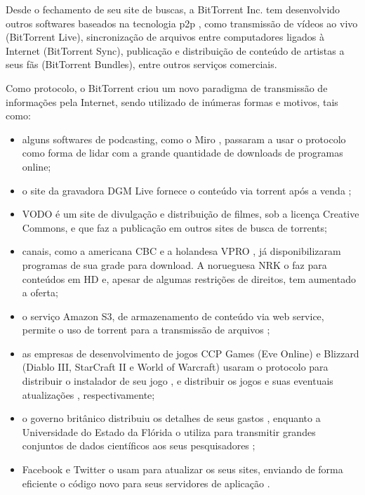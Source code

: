 Desde o fechamento de seu site de buscas, a BitTorrent Inc. tem desenvolvido outros
softwares baseados na tecnologia \gls*{p2p} \cite{site:bittorrent}, como transmissão de
vídeos ao vivo (BitTorrent Live), sincronização de arquivos entre computadores ligados
à Internet (BitTorrent Sync), publicação e distribuição de conteúdo de artistas a seus
fãs (BitTorrent Bundles), entre outros serviços comerciais.

Como protocolo, o BitTorrent criou um novo paradigma de transmissão de informações pela
Internet, sendo utilizado de inúmeras formas e motivos, tais como:

\begin{itemize}
    \item alguns softwares de podcasting, como o Miro \cite{site:miro}, passaram a
        usar o protocolo como forma de lidar com a grande quantidade de downloads de
        programas online;

    \item o site da gravadora DGM Live fornece o conteúdo via torrent após a venda
        \cite{site:dgm};

    \item VODO \cite{site:vodo} é um site de divulgação e distribuição de filmes, sob a
        licença Creative Commons, e que faz a publicação em outros sites de busca de
        torrents;

    \item canais, como a americana CBC \cite{site:cbc} e a holandesa VPRO
        \cite{site:vpro}, já disponibilizaram programas de sua grade para download. A
        norueguesa NRK o faz para conteúdos em HD \cite{site:nrk} e, apesar de algumas
        restrições de direitos, tem aumentado a oferta;

    \item o serviço Amazon S3, de armazenamento de conteúdo via web service, permite o
        uso de torrent para a transmissão de arquivos \cite{site:aws-s3};

    \item as empresas de desenvolvimento de jogos CCP Games (Eve Online) e Blizzard
        (Diablo III, StarCraft II e World of Warcraft) usaram o protocolo para
        distribuir o instalador de seu jogo \cite{site:eve}, e distribuir os jogos e
        suas eventuais atualizações \cite{site:blizzard}, respectivamente;

    \item o governo britânico distribuiu os detalhes de seus gastos \cite{site:gov-uk},
        enquanto a Universidade do Estado da Flórida o utiliza para transmitir grandes
        conjuntos de dados científicos aos seus pesquisadores \cite{site:univ-fl};

    \item Facebook \cite{site:facebook-torrent} e Twitter \cite{site:twitter-torrent}
        o usam para atualizar os seus sites, enviando de forma eficiente o código novo
        para seus servidores de aplicação \cite{site:twitter-torrent-power}.
\end{itemize}

